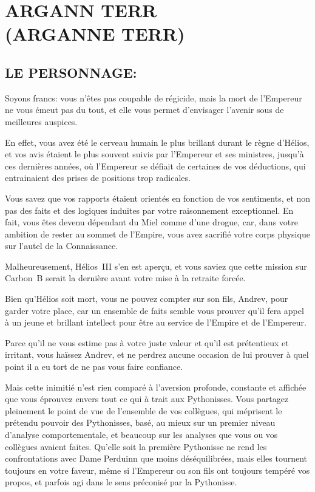 \documentclass[14pt,twocolumn]{extarticle}
\begin{document}
\section{ARGANN TERR\\(ARGANNE TERR)}

\subsection{LE PERSONNAGE:}

Soyons francs: vous n'êtes pas coupable de régicide, mais la mort de
l'Empereur ne vous émeut pas du tout, et elle vous permet d'envisager l'avenir
sous de meilleures auspices.

En effet, vous avez été le cerveau humain le plus
brillant durant le règne d'Hélios, et vos avis étaient le plus souvent suivis
par l'Empereur et ses ministres, jusqu'à ces dernières années, où l'Empereur se
défiait de certaines de vos déductions, qui entrainaient des prises de
positions trop radicales.

Vous savez que vos rapports étaient orientés en fonction de vos sentiments, et
non pas des faits et des logiques induites par votre raisonnement exceptionnel.
En fait, vous êtes devenu dépendant du Miel comme d'une drogue, car, dans votre
ambition de rester au sommet de l'Empire, vous avez sacrifié votre corps
physique sur l'autel de la Connaissance.

Malheureusement, Hélios~III s'en est aperçu, et vous saviez que cette mission
sur Carbon~B serait la dernière avant votre mise à la retraite forcée.

Bien qu'Hélios soit mort, vous ne pouvez compter sur son fils, Andrev, pour
garder votre place, car un ensemble de faits semble vous prouver qu'il fera
appel à un jeune et brillant intellect pour être au service de l'Empire et de
l'Empereur.

Parce qu'il ne vous estime pas à votre juste valeur et qu'il est prétentieux et
irritant, vous haïssez Andrev, et ne perdrez aucune occasion de lui prouver à
quel point il a eu tort de ne pas vous faire confiance.

Mais cette inimitié n'est rien comparé à l'aversion profonde, constante et
affichée que vous éprouvez envers tout ce qui à trait aux Pythonisses. Vous
partagez pleinement le point de vue de l'ensemble de vos collègues, qui
méprisent le prétendu pouvoir des Pythonisses, basé, au mieux sur un premier
niveau d'analyse comportementale, et beaucoup sur les analyses que vous ou vos
collègues avaient faites. Qu'elle soit la première Pythonisse ne rend les
confrontations avec Dame Perduinn que moins déséquilibrées, mais elles tournent
toujours en votre faveur, même si l'Empereur ou son fils ont toujours tempéré
vos propos, et parfois agi dans le sens préconisé par la Pythonisse.
\end{document}
